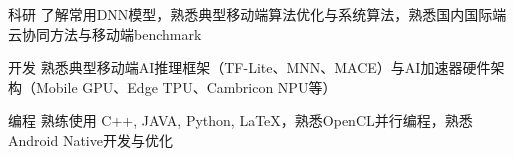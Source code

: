 

\begin{cvskills}


  \cvskill
    {科研} %
    {了解常用DNN模型，熟悉典型移动端算法优化与系统算法，熟悉国内国际端云协同方法与移动端benchmark} %

  \cvskill
    {开发} %
    {熟悉典型移动端AI推理框架（TF-Lite、MNN、MACE）与AI加速器硬件架构（Mobile GPU、Edge TPU、Cambricon NPU等）} %

\cvskill
  {编程} %
  {熟练使用 C++, JAVA, Python, LaTeX，熟悉OpenCL并行编程，熟悉Android Native开发与优化} %







\end{cvskills}
